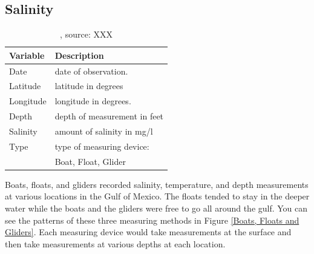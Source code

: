 \documentclass[authoryear,12pt]{elsarticle}
\begin{document}
\subsection{Salinity}

\begin{table}
\begin{tabular}{lp{9.5cm}}
\bf Variable & \bf Description \\\hline
Date & date of observation. \\
Latitude & latitude in degrees \\
Longitude & longitude in degrees. \\
Depth & depth of measurement in feet \\
Salinity &  amount of salinity in mg/l \\
Type &  type of measuring device: \\
& {\small Boat, Float, Glider} \\
\end{tabular}
\label{table.animal}
\caption{, source: XXX}
\end{table}

Boats, floats, and gliders recorded salinity, temperature, and depth measurements at various locations in the Gulf of Mexico. The floats tended to stay in the deeper water while the boats and the gliders were free to go all around the gulf.  You can see the patterns of these three measuring methods in Figure \ref {Boats, Floats and Gliders}. Each measuring device would take measurements at the surface and then take measurements at various depths at each location.  
\end{document}
